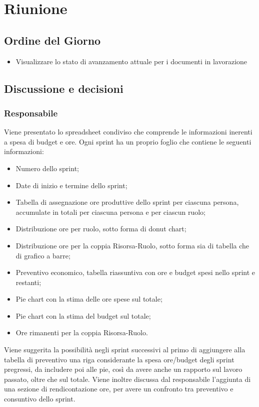 \section{Riunione}
\subsection{Ordine del Giorno}
\begin{itemize}
	\item Visualizzare lo stato di avanzamento attuale per i documenti in lavorazione
\end{itemize}

\subsection{Discussione e decisioni}

\subsubsection{Responsabile}
Viene presentato lo spreadsheet condiviso che comprende le informazioni inerenti a spesa di budget e ore. Ogni sprint ha un proprio foglio che contiene le seguenti informazioni:
\begin{itemize}
	\item Numero dello sprint;
	\item Date di inizio e termine dello sprint;
	\item Tabella di assegnazione ore produttive dello sprint per ciascuna persona, accumulate in totali per ciascuna persona e per ciascun ruolo;
	\item Distribuzione ore per ruolo, sotto forma di donut chart;
	\item Distribuzione ore per la coppia Risorsa-Ruolo, sotto forma sia di tabella che di grafico a barre;
	\item Preventivo economico, tabella riassuntiva con ore e budget spesi nello sprint e restanti;
	\item Pie chart con la stima delle ore spese sul totale;
	\item Pie chart con la stima del budget sul totale;
	\item Ore rimanenti per la coppia Risorsa-Ruolo.
\end{itemize}
\vspace{0.5\baselineskip}

Viene suggerita la possibilità negli sprint successivi al primo di aggiungere alla tabella di preventivo una riga considerante la spesa ore/budget degli sprint pregressi, da includere poi alle pie, così da avere anche un rapporto sul lavoro passato, oltre che sul totale. Viene inoltre discussa dal responsabile l'aggiunta di una sezione di rendicontazione ore, per avere un confronto tra preventivo e consuntivo dello sprint.\\

